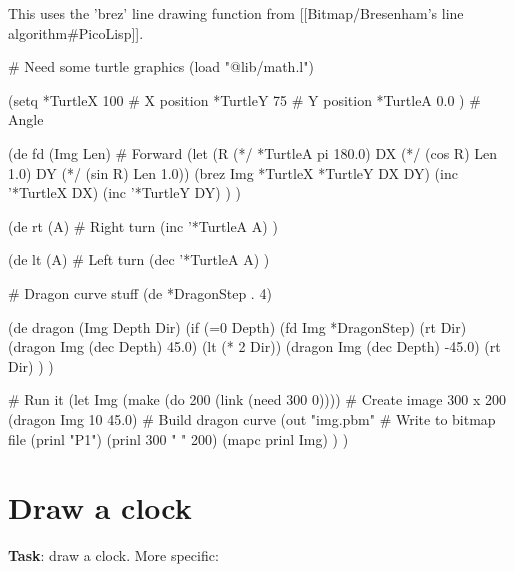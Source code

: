 \begin{wideverbatim}

This uses the 'brez' line drawing function from
[[Bitmap/Bresenham's line algorithm#PicoLisp]].

# Need some turtle graphics
(load "@lib/math.l")

(setq
   *TurtleX 100      # X position
   *TurtleY  75      # Y position
   *TurtleA 0.0 )    # Angle

(de fd (Img Len)  # Forward
   (let (R (*/ *TurtleA pi 180.0)  DX (*/ (cos R) Len 1.0)  DY (*/ (sin R) Len 1.0))
      (brez Img *TurtleX *TurtleY DX DY)
      (inc '*TurtleX DX)
      (inc '*TurtleY DY) ) )

(de rt (A)  # Right turn
   (inc '*TurtleA A) )

(de lt (A)  # Left turn
   (dec '*TurtleA A) )


# Dragon curve stuff
(de *DragonStep . 4)

(de dragon (Img Depth Dir)
   (if (=0 Depth)
      (fd Img *DragonStep)
      (rt Dir)
      (dragon Img (dec Depth) 45.0)
      (lt (* 2 Dir))
      (dragon Img (dec Depth) -45.0)
      (rt Dir) ) )

# Run it
(let Img (make (do 200 (link (need 300 0))))       # Create image 300 x 200
   (dragon Img 10 45.0)                            # Build dragon curve
   (out "img.pbm"                                  # Write to bitmap file
      (prinl "P1")
      (prinl 300 " " 200)
      (mapc prinl Img) ) )

\end{wideverbatim}


\pagebreak{}
\section*{Draw a clock}

\textbf{Task}: draw a clock. More specific:

